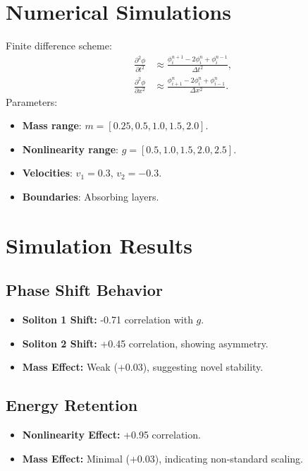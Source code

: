 \documentclass{article}
\begin{document}
\section{Numerical Simulations}
Finite difference scheme:
\begin{align}
\frac{\partial^2 \phi}{\partial t^2} &\approx \frac{\phi_i^{n+1} - 2 \phi_i^n + \phi_i^{n-1}}{\Delta t^2}, \\
\frac{\partial^2 \phi}{\partial x^2} &\approx \frac{\phi_{i+1}^n - 2 \phi_i^n + \phi_{i-1}^n}{\Delta x^2}.
\end{align}
Parameters:
\begin{itemize}
    \item \textbf{Mass range}: \(m = [0.25, 0.5, 1.0, 1.5, 2.0]\).
    \item \textbf{Nonlinearity range}: \(g = [0.5, 1.0, 1.5, 2.0, 2.5]\).
    \item \textbf{Velocities}: \(v_1 = 0.3\), \(v_2 = -0.3\).
    \item \textbf{Boundaries}: Absorbing layers.
\end{itemize}

\section{Simulation Results}
\subsection{Phase Shift Behavior}
\begin{itemize}
    \item \textbf{Soliton 1 Shift:} -0.71 correlation with \(g\).
    \item \textbf{Soliton 2 Shift:} +0.45 correlation, showing asymmetry.
    \item \textbf{Mass Effect:} Weak (\(+0.03\)), suggesting novel stability.
\end{itemize}
\subsection{Energy Retention}
\begin{itemize}
    \item \textbf{Nonlinearity Effect:} +0.95 correlation.
    \item \textbf{Mass Effect:} Minimal (+0.03), indicating non-standard scaling.
\end{itemize}
\end{document}
